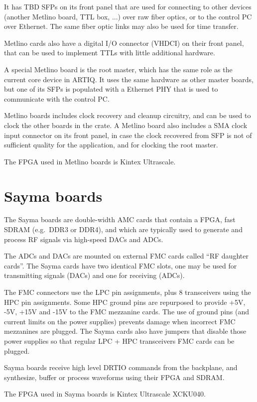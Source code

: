 \documentclass[11pt]{paper}
\begin{document}
It has TBD SFPs on its front panel that are used for connecting to other devices (another Metlino board, TTL box, ...) over raw fiber optics, or to the control PC over Ethernet. The same fiber optic links may also be used for time transfer.

Metlino cards also have a digital I/O connector (VHDCI) on their front panel, that can be used to implement TTLs with little additional hardware.

A special Metlino board is the root master, which has the same role as the current core device in ARTIQ. It uses the same hardware as other master boards, but one of its SFPs is populated with a Ethernet PHY that is used to communicate with the control PC.

Metlino boards includes clock recovery and cleanup circuitry, and can be used to clock the other boards in the crate. A Metlino board also includes a SMA clock input connector on its front panel, in case the clock recovered from SFP is not of sufficient quality for the application, and for clocking the root master.

The FPGA used in Metlino boards is Kintex Ultrascale.

\section{Sayma boards}
The Sayma boards are double-width AMC cards that contain a FPGA, fast SDRAM (e.g.\ DDR3 or DDR4), and which are typically used to generate and process RF signals via high-speed DACs and ADCs.

The ADCs and DACs are mounted on external FMC cards called ``RF daughter cards''. The Sayma cards have two identical FMC slots, one may be used for transmitting signals (DACs) and one for receiving (ADCs).

The FMC connectors use the LPC pin assignments, plus 8 transceivers using the HPC pin assignments. Some HPC ground pins are repurposed to provide +5V, -5V, +15V and -15V to the FMC mezzanine cards. The use of ground pins (and current limits on the power supplies) prevents damage when incorrect FMC mezzanines are plugged. The Sayma cards also have jumpers that disable those power supplies so that regular LPC + HPC transceivers FMC cards can be plugged.

Sayma boards receive high level DRTIO commands from the backplane, and synthesize, buffer or process waveforms using their FPGA and SDRAM.

The FPGA used in Sayma boards is Kintex Ultrascale XCKU040.
\end{document}
